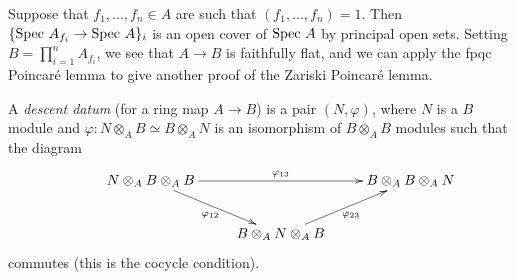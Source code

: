 \begin{ex} Suppose that $f_1, ..., f_n \in A$ are such that $(f_1, ..., f_n) = 1$. Then $\{\mbox{\rm Spec }A_{f_i} \rightarrow \mbox{\rm Spec }A\}_i$ is an open cover of $\mbox{\rm Spec }A$ by principal open sets. Setting $B = \prod_{i=1}^n A_{f_i}$, we see that $A \rightarrow B$ is faithfully flat, and we can apply the fpqc Poincar\'{e} lemma to give another proof of the Zariski Poincar\'{e} lemma.
\end{ex}

\begin{defn} A \emph{descent datum} (for a ring map $A \rightarrow B$) is a pair $(N,\varphi)$, where $N$ is a $B$ module and $\varphi: N \otimes_A B \simeq B\otimes_A N$ is an isomorphism of $B\otimes_A B$ modules such that the diagram
\begin{align*}
\xymatrix{&N\otimes_AB\otimes_AB \ar[rr]^{\varphi_{13}} \ar[dr]_{\varphi_{12}} & &B\otimes_AB\otimes_AN\\
& &B\otimes_AN\otimes_AB \ar[ur]_{\varphi_{23}}}
\end{align*}
commutes (this is the cocycle condition).
\end{defn}

